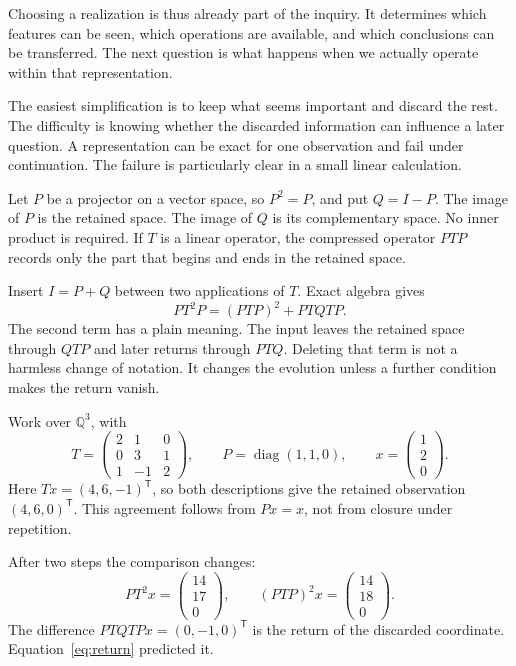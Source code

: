 Choosing a realization is thus already part of the inquiry. It determines which features can be seen, which operations are available, and which conclusions can be transferred. The next question is what happens when we actually operate within that representation.


The easiest simplification is to keep what seems important and discard the rest. The difficulty is knowing whether the discarded information can influence a later question. A representation can be exact for one observation and fail under continuation. The failure is particularly clear in a small linear calculation.

Let \(P\) be a projector on a vector space, so \(P^2=P\), and put \(Q=I-P\). The image of \(P\) is the retained space. The image of \(Q\) is its complementary space. No inner product is required. If \(T\) is a linear operator, the compressed operator \(PTP\) records only the part that begins and ends in the retained space.

Insert \(I=P+Q\) between two applications of \(T\). Exact algebra gives
\begin{equation}\label{eq:return}
PT^2P=(PTP)^2+PTQTP.
\end{equation}
The second term has a plain meaning. The input leaves the retained space through \(QTP\) and later returns through \(PTQ\). Deleting that term is not a harmless change of notation. It changes the evolution unless a further condition makes the return vanish.

Work over \(\mathbb Q^3\), with
\[
T=\begin{pmatrix}2&1&0\\0&3&1\\1&-1&2\end{pmatrix},
\qquad P=\operatorname{diag}(1,1,0),
\qquad x=\begin{pmatrix}1\\2\\0\end{pmatrix}.
\]
Here \(Tx=(4,6,-1)^{\mathsf T}\), so both descriptions give the retained observation \((4,6,0)^{\mathsf T}\). This agreement follows from \(Px=x\), not from closure under repetition.

After two steps the comparison changes:
\[
PT^2x=\begin{pmatrix}14\\17\\0\end{pmatrix},
\qquad
(PTP)^2x=\begin{pmatrix}14\\18\\0\end{pmatrix}.
\]
The difference \(PTQTPx=(0,-1,0)^{\mathsf T}\) is the return of the discarded coordinate. Equation~\eqref{eq:return} predicted it.


